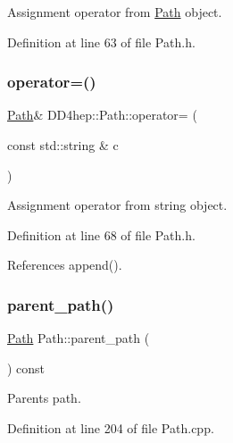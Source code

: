 Assignment operator from \hyperlink{class_d_d4hep_1_1_path}{Path} object. 



Definition at line 63 of file Path.\+h.

\hypertarget{class_d_d4hep_1_1_path_aa1a61f3b3eab565724525f423fe465e6}{}\label{class_d_d4hep_1_1_path_aa1a61f3b3eab565724525f423fe465e6} 
\subsubsection{\texorpdfstring{operator=()}{operator=()}\hspace{0.1cm}{\footnotesize\ttfamily [2/2]}}
{\footnotesize\ttfamily \hyperlink{class_d_d4hep_1_1_path}{Path}\& D\+D4hep\+::\+Path\+::operator= (\begin{DoxyParamCaption}\item[{const std\+::string \&}]{c }\end{DoxyParamCaption})\hspace{0.3cm}{\ttfamily [inline]}}



Assignment operator from string object. 



Definition at line 68 of file Path.\+h.



References append().

\hypertarget{class_d_d4hep_1_1_path_a494ed894cb888b82d6c5a75e2c996e2c}{}\label{class_d_d4hep_1_1_path_a494ed894cb888b82d6c5a75e2c996e2c} 
\subsubsection{\texorpdfstring{parent\+\_\+path()}{parent\_path()}}
{\footnotesize\ttfamily \hyperlink{class_d_d4hep_1_1_path}{Path} Path\+::parent\+\_\+path (\begin{DoxyParamCaption}{ }\end{DoxyParamCaption}) const}



Parent\textquotesingle{}s path. 



Definition at line 204 of file Path.\+cpp.



